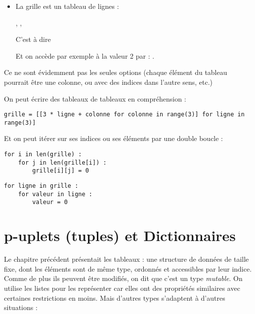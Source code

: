 {\begin{itemize}
	\item La grille est un tableau de lignes  :
	
	, ,
	
	C'est à dire 
	
	Et on accède par exemple à la valeur 2 par : .
	
\end{itemize}

Ce ne sont évidemment pas les seules options (chaque élément du tableau pourrait être une colonne, ou avec des indices dans l'autre sens, etc.)

\medskip
On peut écrire des tableaux de tableaux en compréhension :

\vspace{-2ex}
\begin{verbatim}
grille = [[3 * ligne + colonne for colonne in range(3)] for ligne in range(3)]
\end{verbatim}

Et on peut itérer sur ses indices ou ses éléments par une double boucle :

\vspace{-2ex}
\begin{multicols}{2}
\begin{verbatim}
for i in len(grille) :
    for j in len(grille[i]) :
        grille[i][j] = 0
\end{verbatim}

\begin{verbatim}
for ligne in grille :
    for valeur in ligne :
        valeur = 0
\end{verbatim}
\end{multicols}


\chapter{p-uplets (tuples) et Dictionnaires}

Le chapitre précédent présentait les tableaux : une structure de données de taille fixe, dont les éléments sont de même type, ordonnés et accessibles par leur indice. Comme de plus ils peuvent être modifiés, on dit que c'est un type \emph{mutable}. On utilise les listes pour les représenter car elles ont des propriétés similaires avec certaines restrictions en moins. Mais d'autres types s'adaptent à d'autres situations :

}
